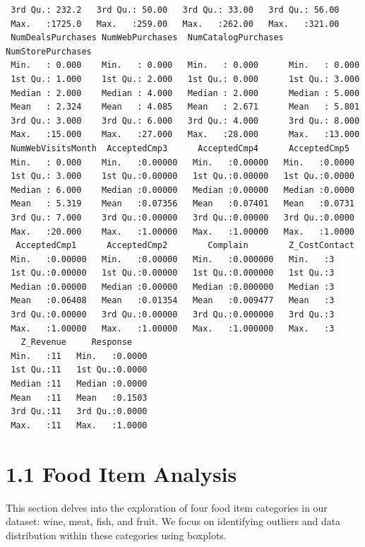 \documentclass[
  a4paperpaper,
  DIV=11,
  numbers=noendperiod]{scrartcl}
\begin{document}
\begin{verbatim}
 3rd Qu.: 232.2   3rd Qu.: 50.00   3rd Qu.: 33.00   3rd Qu.: 56.00  
 Max.   :1725.0   Max.   :259.00   Max.   :262.00   Max.   :321.00  
 NumDealsPurchases NumWebPurchases  NumCatalogPurchases NumStorePurchases
 Min.   : 0.000    Min.   : 0.000   Min.   : 0.000      Min.   : 0.000   
 1st Qu.: 1.000    1st Qu.: 2.000   1st Qu.: 0.000      1st Qu.: 3.000   
 Median : 2.000    Median : 4.000   Median : 2.000      Median : 5.000   
 Mean   : 2.324    Mean   : 4.085   Mean   : 2.671      Mean   : 5.801   
 3rd Qu.: 3.000    3rd Qu.: 6.000   3rd Qu.: 4.000      3rd Qu.: 8.000   
 Max.   :15.000    Max.   :27.000   Max.   :28.000      Max.   :13.000   
 NumWebVisitsMonth  AcceptedCmp3      AcceptedCmp4      AcceptedCmp5   
 Min.   : 0.000    Min.   :0.00000   Min.   :0.00000   Min.   :0.0000  
 1st Qu.: 3.000    1st Qu.:0.00000   1st Qu.:0.00000   1st Qu.:0.0000  
 Median : 6.000    Median :0.00000   Median :0.00000   Median :0.0000  
 Mean   : 5.319    Mean   :0.07356   Mean   :0.07401   Mean   :0.0731  
 3rd Qu.: 7.000    3rd Qu.:0.00000   3rd Qu.:0.00000   3rd Qu.:0.0000  
 Max.   :20.000    Max.   :1.00000   Max.   :1.00000   Max.   :1.0000  
  AcceptedCmp1      AcceptedCmp2        Complain        Z_CostContact
 Min.   :0.00000   Min.   :0.00000   Min.   :0.000000   Min.   :3    
 1st Qu.:0.00000   1st Qu.:0.00000   1st Qu.:0.000000   1st Qu.:3    
 Median :0.00000   Median :0.00000   Median :0.000000   Median :3    
 Mean   :0.06408   Mean   :0.01354   Mean   :0.009477   Mean   :3    
 3rd Qu.:0.00000   3rd Qu.:0.00000   3rd Qu.:0.000000   3rd Qu.:3    
 Max.   :1.00000   Max.   :1.00000   Max.   :1.000000   Max.   :3    
   Z_Revenue     Response     
 Min.   :11   Min.   :0.0000  
 1st Qu.:11   1st Qu.:0.0000  
 Median :11   Median :0.0000  
 Mean   :11   Mean   :0.1503  
 3rd Qu.:11   3rd Qu.:0.0000  
 Max.   :11   Max.   :1.0000  
\end{verbatim}

\hypertarget{food-item-analysis}{%
\section{1.1 Food Item Analysis}\label{food-item-analysis}}

This section delves into the exploration of four food item categories in
our dataset: wine, meat, fish, and fruit. We focus on identifying
outliers and data distribution within these categories using boxplots.
\end{document}
